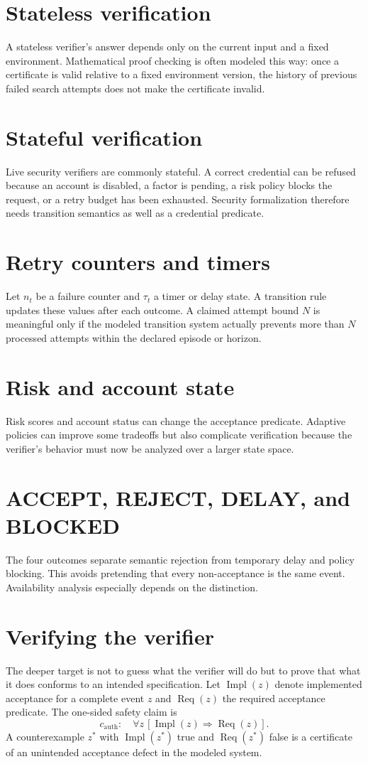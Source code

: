\documentclass[11pt,oneside]{book}
\theoremstyle{definition}
\theoremstyle{remark}
\newcommand{\Impl}{\operatorname{Impl}}
\newcommand{\Req}{\operatorname{Req}}
\begin{document}
\section{Stateless verification}
A stateless verifier's answer depends only on the current input and a fixed environment. Mathematical proof checking is often modeled this way: once a certificate is valid relative to a fixed environment version, the history of previous failed search attempts does not make the certificate invalid.

\section{Stateful verification}
Live security verifiers are commonly stateful. A correct credential can be refused because an account is disabled, a factor is pending, a risk policy blocks the request, or a retry budget has been exhausted. Security formalization therefore needs transition semantics as well as a credential predicate.

\section{Retry counters and timers}
Let $n_t$ be a failure counter and $\tau_t$ a timer or delay state. A transition rule updates these values after each outcome. A claimed attempt bound $N$ is meaningful only if the modeled transition system actually prevents more than $N$ processed attempts within the declared episode or horizon.

\section{Risk and account state}
Risk scores and account status can change the acceptance predicate. Adaptive policies can improve some tradeoffs but also complicate verification because the verifier's behavior must now be analyzed over a larger state space.

\section{ACCEPT, REJECT, DELAY, and BLOCKED}
The four outcomes separate semantic rejection from temporary delay and policy blocking. This avoids pretending that every non-acceptance is the same event. Availability analysis especially depends on the distinction.

\section{Verifying the verifier}
\label{sec:verify-verifier}
The deeper target is not to guess what the verifier will do but to prove that what it does conforms to an intended specification. Let $\Impl(z)$ denote implemented acceptance for a complete event $z$ and $\Req(z)$ the required acceptance predicate. The one-sided safety claim is
\[
c_{\mathrm{auth}}:\quad \forall z\,[\Impl(z)\Rightarrow\Req(z)].
\]
A counterexample $z^*$ with $\Impl(z^*)$ true and $\Req(z^*)$ false is a certificate of an unintended acceptance defect in the modeled system.
\end{document}
